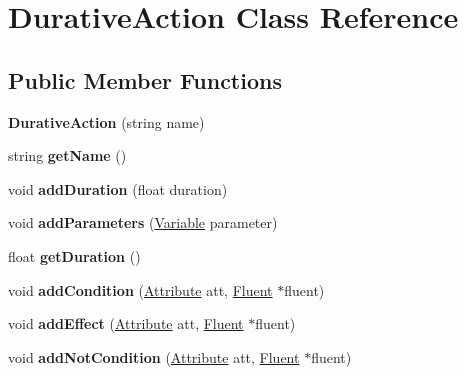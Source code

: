 \hypertarget{classDurativeAction}{\section{Durative\+Action Class Reference}
\label{classDurativeAction}
}
\subsection*{Public Member Functions}
\begin{DoxyCompactItemize}
\item 
\hypertarget{classDurativeAction_a2f29690e45c91843985212819bdb9216}{{\bfseries Durative\+Action} (string name)}\label{classDurativeAction_a2f29690e45c91843985212819bdb9216}

\item 
\hypertarget{classDurativeAction_a1cbe578c21997bc536634a8e7e07a61b}{string {\bfseries get\+Name} ()}\label{classDurativeAction_a1cbe578c21997bc536634a8e7e07a61b}

\item 
\hypertarget{classDurativeAction_a8179dcc025b0b1785aaf45950f637f1c}{void {\bfseries add\+Duration} (float duration)}\label{classDurativeAction_a8179dcc025b0b1785aaf45950f637f1c}

\item 
\hypertarget{classDurativeAction_ab66c488cd2c8c6f6de237df6330e94c9}{void {\bfseries add\+Parameters} (\hyperlink{classVariable}{Variable} parameter)}\label{classDurativeAction_ab66c488cd2c8c6f6de237df6330e94c9}

\item 
\hypertarget{classDurativeAction_a5126eba1c93a071e65d0caf8cee35e7b}{float {\bfseries get\+Duration} ()}\label{classDurativeAction_a5126eba1c93a071e65d0caf8cee35e7b}

\item 
\hypertarget{classDurativeAction_a53de39340b940f87a92e53170295ca7f}{void {\bfseries add\+Condition} (\hyperlink{classAttribute}{Attribute} att, \hyperlink{classFluent}{Fluent} $\ast$fluent)}\label{classDurativeAction_a53de39340b940f87a92e53170295ca7f}

\item 
\hypertarget{classDurativeAction_a4151be1dc10390fff5e27836bb3a2413}{void {\bfseries add\+Effect} (\hyperlink{classAttribute}{Attribute} att, \hyperlink{classFluent}{Fluent} $\ast$fluent)}\label{classDurativeAction_a4151be1dc10390fff5e27836bb3a2413}

\item 
\hypertarget{classDurativeAction_a6b5c3253a5f75604ad2c9feedd7d55b3}{void {\bfseries add\+Not\+Condition} (\hyperlink{classAttribute}{Attribute} att, \hyperlink{classFluent}{Fluent} $\ast$fluent)}\label{classDurativeAction_a6b5c3253a5f75604ad2c9feedd7d55b3}


\end{DoxyCompactItemize}
